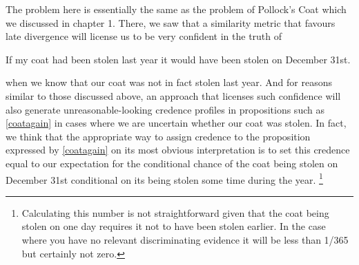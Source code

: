 \documentclass[If.tex]{subfiles}
\begin{document}
The problem here is essentially the same as the problem of Pollock's Coat which we discussed in chapter 1. There, we saw that a similarity metric that favours late divergence will license us to be very confident in the truth of
\begin{prop}
\nitem \label{coatagain}
  If my coat had been stolen last year it would have been stolen on
  December 31st.
\end{prop}
when we know that our coat was not in fact stolen last year. And for reasons similar to those discussed above, an approach that licenses such confidence will also generate unreasonable-looking credence profiles in propositions such as \ref{coatagain} in cases where we are uncertain whether our coat was stolen. In fact, we think that the appropriate way to assign credence to the proposition expressed by \ref{coatagain} on its most obvious interpretation is to set this credence equal to our expectation for the conditional chance of the coat being stolen on December 31st conditional on its being stolen some time during the year.%
\footnote{Calculating this number is not straightforward given that the coat being stolen on one day requires it not to have been stolen earlier. In the case where you have no relevant discriminating evidence it will be less than 1/365 but certainly not zero.}
\end{document}
